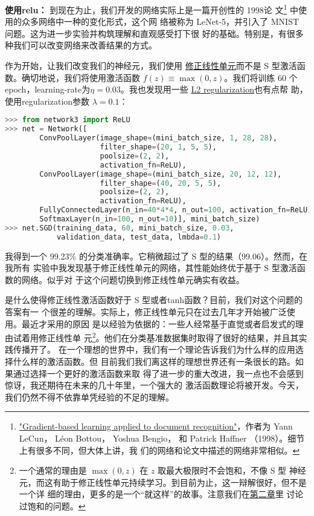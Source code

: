 \textbf{使用\gls*{relu}：} 到现在为止，我们开发的网络实际上是一篇开创性的 1998论
文\footnote{\href{http://yann.lecun.com/exdb/publis/pdf/lecun-98.pdf}{"Gradient-based
    learning applied to document recognition"}，作者为 Yann LeCun， Léon Bottou，
  Yoshua Bengio， 和 Patrick Haffner （1998）。细节上有很多不同，但大体上讲，我
  们的网络和论文中描述的网络非常相似。} 中使用的众多网络中一种的变化形式，这个网
络被称为 LeNet-5，并引入了 MNIST 问题。这为进一步实验并构筑理解和直观感受打下很
好的基础。特别是，有很多种我们可以改变网络来改善结果的方式。

作为开始，让我们改变我们的神经元，我们使用%
\hyperref[sec:other_models_of_artificial_neuron]{修正线性单元}而不是 S 型激活函
数。确切地说，我们将使用激活函数 $f(z) \equiv \max(0, z)$。我们将训练 $60$ 个%
\gls*{epoch}，\gls*{learning-rate}为$\eta = 0.03$。我也发现用一些
\hyperref[sec:overfitting_and_regularization]{L2 \gls*{regularization}}也有点帮
助，使用\gls*{regularization}参数 $\lambda = 0.1$：
\begin{lstlisting}[language=Python]
>>> from network3 import ReLU
>>> net = Network([
        ConvPoolLayer(image_shape=(mini_batch_size, 1, 28, 28), 
                      filter_shape=(20, 1, 5, 5), 
                      poolsize=(2, 2), 
                      activation_fn=ReLU),
        ConvPoolLayer(image_shape=(mini_batch_size, 20, 12, 12), 
                      filter_shape=(40, 20, 5, 5), 
                      poolsize=(2, 2), 
                      activation_fn=ReLU),
        FullyConnectedLayer(n_in=40*4*4, n_out=100, activation_fn=ReLU),
        SoftmaxLayer(n_in=100, n_out=10)], mini_batch_size)
>>> net.SGD(training_data, 60, mini_batch_size, 0.03, 
            validation_data, test_data, lmbda=0.1)
\end{lstlisting}

我得到一个 99.23\% 的分类准确率。它稍微超过了 S 型的结果（99.06）。然而，在我所有
实验中我发现基于修正线性单元的网络，其性能始终优于基于 S 型激活函数的网络。似乎对
于这个问题切换到修正线性单元确实有收益。

是什么使得修正线性激活函数好于 S 型或者\gls*{tanh}函数？目前，我们对这个问题的答案有一
个很差的理解。实际上，修正线性单元只在过去几年才开始被广泛使用。最近才采用的原因
是以经验为依据的：一些人经常基于直觉或者启发式的理由试着用修正线性单
元\footnote{一个通常的理由是 $\max(0, z)$ 在 $z$ 取最大极限时不会饱和，不像 S 型
  神经元，而这有助于修正线性单元持续学习。到目前为止，这一辩解很好，但不是一个详
  细的理由，更多的是一个“就这样”的故事。注意我们在\hyperref[saturation]{第二章}里
  讨论过饱和的问题。}。他们在分类基准数据集时取得了很好的结果，并且其实践传播开了。
在一个理想的世界中，我们有一个理论告诉我们为什么样的应用选择什么样的激活函数。但
目前我们我们离这样的理想世界还有一条很长的路。如果通过选择一个更好的激活函数来取
得了进一步的重大改进，我一点也不会感到惊讶，我还期待在未来的几十年里，一个强大的
激活函数理论将被开发。今天，
我们仍然不得不依靠单凭经验的不足的理解。\\

